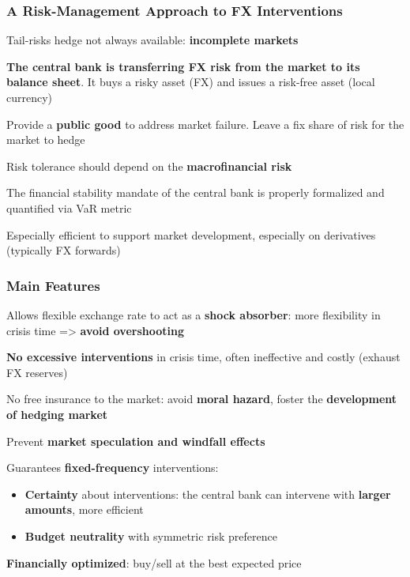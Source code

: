 \documentclass{beamer}
\newenvironment{wideitemize}{\itemize\addtolength{\itemsep}{10pt}}{\enditemize}
\newenvironment{wideenumerate}{\enumerate\addtolength{\itemsep}{10pt}}{\endenumerate}
\begin{document}
\begin{frame}
  \frametitle{A Risk-Management Approach to FX Interventions}
  \begin{wideitemize}    
  \item Tail-risks hedge not always available: \textbf{incomplete markets}
    \item \textbf{The central bank is transferring FX risk from the market to
      its balance sheet}. It buys a risky asset (FX) and issues a risk-free asset
      (local currency)    
    \item Provide a \textbf{public good} to address market failure. Leave a
      fix share of risk for the market to hedge 
    \item Risk tolerance should depend on the \textbf{macrofinancial risk} 
    \item The financial stability mandate of the central bank is properly
      formalized and quantified via VaR metric
    \item Especially efficient to support market development, especially on derivatives (typically FX forwards)
    
  \end{wideitemize}  
\end{frame}

\begin{frame}
    \frametitle{Main Features}
  \begin{wideenumerate}
  \item Allows flexible exchange rate to act as a \textbf{shock absorber}:
    more flexibility in crisis time => \textbf{avoid overshooting}
  \item \textbf{No excessive interventions} in crisis time, often ineffective
    and costly (exhaust FX reserves)
  \item No free insurance to the market: avoid \textbf{moral
      hazard}, foster the \textbf{development of hedging market}
  \item Prevent \textbf{market speculation and windfall effects}
  \item Guarantees \textbf{fixed-frequency} interventions: 
    \begin{itemize}
    \item \textbf{Certainty} about interventions: the central bank can intervene with
      \textbf{larger amounts}, more efficient
    \item \textbf{Budget neutrality} with symmetric risk preference
    \end{itemize}
  \item \textbf{Financially optimized}: buy/sell at the best expected price
  \end{wideenumerate}  
\end{frame}
\end{document}
